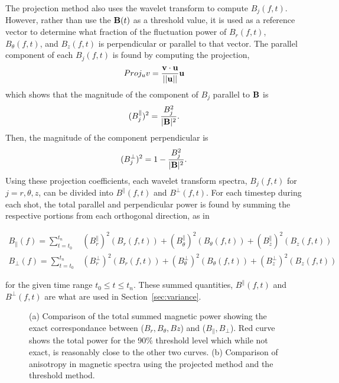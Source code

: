 \documentclass[manuscript]{aastex}
\begin{document}
The projection method also uses the wavelet transform to compute $B_{j}(f,t)$. However, rather than use the ${\bf B}(t)$ as a threshold value, it is used as a reference vector to determine what fraction of the fluctuation power of $B_{r}(f,t)$, $B_{\theta}(f,t)$, and $B_{z}(f,t)$ is perpendicular or parallel to that vector. The parallel component of each $B_{j}(f,t)$ is found by computing the projection,
\begin{equation}
Proj_{u}v = \frac{{\bf v} \cdot {\bf u}}{||{\bf u}||}{\bf u}
\label{eq:projection}
\end{equation}
which shows that the magnitude of the component of $B_{j}$ parallel to ${\bf B}$ is
\begin{equation}
(B_{j}^{\parallel})^{2} = \frac{B^{2}_{j}}{|{\bf B}|^{2}}.
\label{eq:para_mag}
\end{equation}
Then, the magnitude of the component perpendicular is
\begin{equation}
(B_{j}^{\perp})^2 = 1 - \frac{B^{2}_{j}}{|{\bf B}|^{2}}.
\label{eq:perp_mag}
\end{equation}
Using these projection coefficients, each wavelet transform spectra, $B_{j}(f,t)$ for $j = r,\theta,z$, can be divided into $B^{\parallel}(f,t)$ and $B^{\perp}(f,t)$. For each timestep during each shot, the total parallel and perpendicular power is found by summing the respective portions from each orthogonal direction, as in
\begin{mathletters}
\begin{eqnarray}
B_{\parallel}(f) = \sum_{t=t_{0}}^{t_{n}} &(B_{r}^{\parallel})^{2}(B_{r}(f,t))+(B_{\theta}^{\parallel})^{2}(B_{\theta}(f,t))+(B_{z}^{\parallel})^{2}(B_{z}(f,t))\\
B_{\perp}(f) = \sum_{t=t_{0}}^{t_{n}} &(B_{r}^{\perp})^{2}(B_{r}(f,t))+(B_{\theta}^{\perp})^{2}(B_{\theta}(f,t))+(B_{z}^{\perp})^{2}(B_{z}(f,t))
\label{eq:Bperp}
\end{eqnarray}
\end{mathletters}
for the given time range $t_{0}\leq t \leq t_{n}$. These summed quantities, $B^{\parallel}(f,t)$ and $B^{\perp}(f,t)$ are what are used in Section~\ref{sec:variance}.

\begin{figure}
\caption{\label{fig:powercomparison} (a) Comparison of the total summed magnetic power showing the exact correspondance between ($B_{r},B_{\theta},B{z}$) and ($B_{\parallel},B_{\perp}$). Red curve shows the total power for the 90$\%$ threshold level which while not exact, is reasonably close to the other two curves. (b) Comparison of anisotropy in magnetic spectra using the projected method and the threshold method.}
\end{figure}
\end{document}
